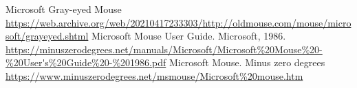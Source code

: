 \documentclass[11pt, a4paper]{article}
\begin{document}
\begin{thebibliography}{9}
 Microsoft Gray-eyed Mouse \url{https://web.archive.org/web/20210417233303/http://oldmouse.com/mouse/microsoft/grayeyed.shtml}
 Microsoft Mouse User Guide. Microsoft, 1986. \url{https://minuszerodegrees.net/manuals/Microsoft/Microsoft%20Mouse%20-%20User's%20Guide%20-%201986.pdf}
 Microsoft Mouse. Minus zero degrees \url{https://www.minuszerodegrees.net/msmouse/Microsoft%20mouse.htm}
\end{thebibliography}
\end{document}
